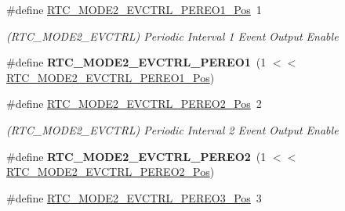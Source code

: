 \begin{DoxyCompactItemize}
\item 
\hypertarget{group___s_a_m_l21___r_t_c_ga0e79167c14a87222de493856568bd6fe}{}\#define \hyperlink{group___s_a_m_l21___r_t_c_ga0e79167c14a87222de493856568bd6fe}{R\+T\+C\+\_\+\+M\+O\+D\+E2\+\_\+\+E\+V\+C\+T\+R\+L\+\_\+\+P\+E\+R\+E\+O1\+\_\+\+Pos}~1\label{group___s_a_m_l21___r_t_c_ga0e79167c14a87222de493856568bd6fe}

\begin{DoxyCompactList}\small\item\em (R\+T\+C\+\_\+\+M\+O\+D\+E2\+\_\+\+E\+V\+C\+T\+R\+L) Periodic Interval 1 Event Output Enable \end{DoxyCompactList}\item 
\hypertarget{group___s_a_m_l21___r_t_c_ga8afbad0c26e616db244521bc8642c640}{}\#define {\bfseries R\+T\+C\+\_\+\+M\+O\+D\+E2\+\_\+\+E\+V\+C\+T\+R\+L\+\_\+\+P\+E\+R\+E\+O1}~(1 $<$$<$ \hyperlink{group___s_a_m_l21___r_t_c_ga0e79167c14a87222de493856568bd6fe}{R\+T\+C\+\_\+\+M\+O\+D\+E2\+\_\+\+E\+V\+C\+T\+R\+L\+\_\+\+P\+E\+R\+E\+O1\+\_\+\+Pos})\label{group___s_a_m_l21___r_t_c_ga8afbad0c26e616db244521bc8642c640}

\item 
\hypertarget{group___s_a_m_l21___r_t_c_gae1804578e8194a9e5efe359be113f916}{}\#define \hyperlink{group___s_a_m_l21___r_t_c_gae1804578e8194a9e5efe359be113f916}{R\+T\+C\+\_\+\+M\+O\+D\+E2\+\_\+\+E\+V\+C\+T\+R\+L\+\_\+\+P\+E\+R\+E\+O2\+\_\+\+Pos}~2\label{group___s_a_m_l21___r_t_c_gae1804578e8194a9e5efe359be113f916}

\begin{DoxyCompactList}\small\item\em (R\+T\+C\+\_\+\+M\+O\+D\+E2\+\_\+\+E\+V\+C\+T\+R\+L) Periodic Interval 2 Event Output Enable \end{DoxyCompactList}\item 
\hypertarget{group___s_a_m_l21___r_t_c_gafd99da4acd052175dc7b01f0cd977777}{}\#define {\bfseries R\+T\+C\+\_\+\+M\+O\+D\+E2\+\_\+\+E\+V\+C\+T\+R\+L\+\_\+\+P\+E\+R\+E\+O2}~(1 $<$$<$ \hyperlink{group___s_a_m_l21___r_t_c_gae1804578e8194a9e5efe359be113f916}{R\+T\+C\+\_\+\+M\+O\+D\+E2\+\_\+\+E\+V\+C\+T\+R\+L\+\_\+\+P\+E\+R\+E\+O2\+\_\+\+Pos})\label{group___s_a_m_l21___r_t_c_gafd99da4acd052175dc7b01f0cd977777}

\item 
\hypertarget{group___s_a_m_l21___r_t_c_ga1063b86f61eb55b5ecb68a4b662711d5}{}\#define \hyperlink{group___s_a_m_l21___r_t_c_ga1063b86f61eb55b5ecb68a4b662711d5}{R\+T\+C\+\_\+\+M\+O\+D\+E2\+\_\+\+E\+V\+C\+T\+R\+L\+\_\+\+P\+E\+R\+E\+O3\+\_\+\+Pos}~3\label{group___s_a_m_l21___r_t_c_ga1063b86f61eb55b5ecb68a4b662711d5}


\end{DoxyCompactItemize}
